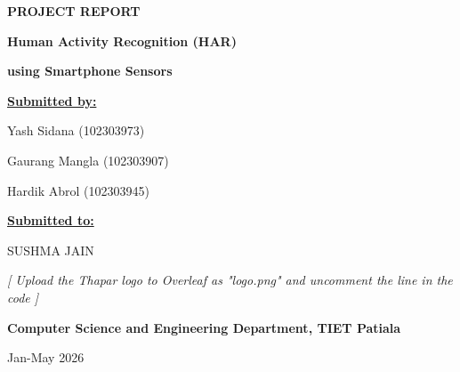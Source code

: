 \documentclass[12pt,a4paper]{article}
\begin{document}
\begin{titlepage}
    \centering
    \vspace*{1cm}
    
    {\huge\bfseries PROJECT REPORT\par}
    \vspace{1cm}
    {\Large\bfseries Human Activity Recognition (HAR)\par}
    {\Large\bfseries using Smartphone Sensors\par}
    
    \vspace{2cm}
    {\large \underline{\textbf{Submitted by:}}\par}
    \vspace{0.3cm}
    Yash Sidana (102303973)\par
    Gaurang Mangla (102303907)\par
    Hardik Abrol (102303945)\par
    
    \vspace{1.5cm}
    {\large \underline{\textbf{Submitted to:}}\par}
    \vspace{0.3cm}
    SUSHMA JAIN\par
    
    \vspace{2cm}
    \textit{[ Upload the Thapar logo to Overleaf as "logo.png" and uncomment the line in the code ]}\par
    
    \vfill
    {\large \textbf{Computer Science and Engineering Department, TIET Patiala}\par}
    {\large Jan-May 2026\par}
\end{titlepage}

\newpage
\tableofcontents
\newpage

\end{document}
